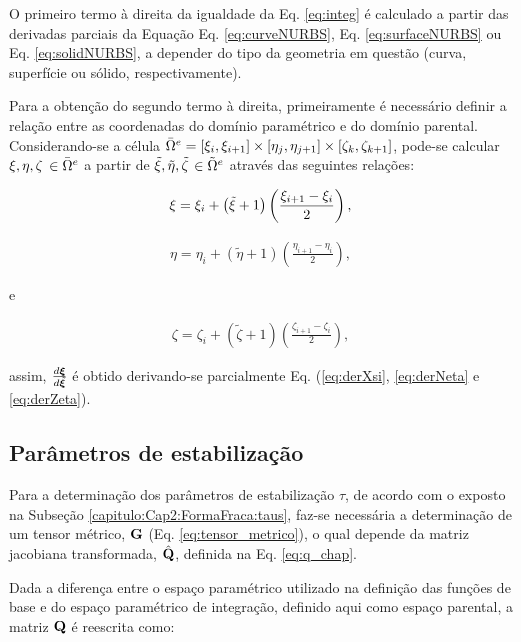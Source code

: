 \documentclass[tese_patricia]{subfiles}
\begin{document}
O primeiro termo à direita da igualdade da Eq. \eqref{eq:integ} é calculado a partir das derivadas parciais da Equação Eq. \eqref{eq:curveNURBS}, Eq. \eqref{eq:surfaceNURBS} ou Eq. \eqref{eq:solidNURBS}, a depender do tipo da geometria em questão (curva, superfície ou sólido, respectivamente).

Para a obtenção do segundo termo à direita, primeiramente é necessário definir a relação entre as coordenadas  do domínio paramétrico e do domínio parental. Considerando-se a célula $\bar{\Omega}^{e} = [\xi_{i},\xi_{i+1}] \times [\eta_{j},\eta_{j+1}] \times [\zeta_{k},\zeta_{k+1}]$, pode-se calcular $\xi,\eta, \zeta$ $\in \bar{\Omega}^{e}$ a partir de $\tilde{\xi},\tilde{\eta}, \tilde{\zeta}$ $\in \tilde{\Omega}^{e}$ através das seguintes relações: 

\begin{align}
\xi = \xi_{i} + \left(\tilde{\xi}+1\right) \left(\frac{\xi_{i+1}-\xi_{i}}{2}\right), \label{eq:derXsi}
\end{align}

\begin{align}
\eta = \eta_{i} + \left(\tilde{\eta}+1\right) \left(\frac{\eta_{i+1}-\eta_{i}}{2}\right), \label{eq:derNeta}
\end{align}

\noindent e

\begin{align}
\zeta = \zeta_{i} + \left(\tilde{\zeta}+1\right) \left(\frac{\zeta_{i+1}-\zeta_{i}}{2}\right), \label{eq:derZeta}
\end{align}

\noindent assim, $\frac{d\bm{\xi}}{d\tilde{\bm{\xi}}}$ é obtido derivando-se parcialmente Eq. (\ref{eq:derXsi}, \ref{eq:derNeta} e \ref{eq:derZeta}).


\subsection{Parâmetros de estabilização}\label{capitulo:Cap3:RepreGeo:taus2}

Para a determinação dos parâmetros de estabilização $\tau$, de acordo com o exposto na Subseção \ref{capitulo:Cap2:FormaFraca:taus}, faz-se necessária a determinação de um tensor métrico, $\mathbf{G}$ (Eq. \ref{eq:tensor_metrico}), o qual depende da matriz jacobiana transformada, $\hat{\mathbf{Q}}$, definida na Eq. \ref{eq:q_chap}.

Dada a diferença entre o espaço paramétrico utilizado na definição das funções de base e do espaço paramétrico de integração, definido aqui como espaço parental, a matriz $\mathbf{Q}$ é reescrita como:
\end{document}
